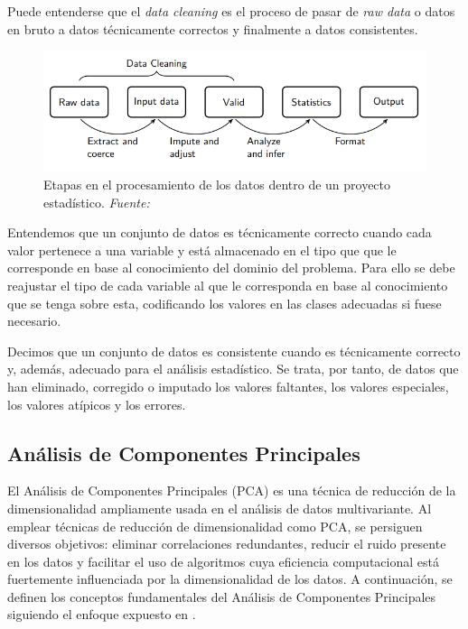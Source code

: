 \documentclass[12pt,a4paper,]{book}
\numberwithin{dummy}{section}
\theoremstyle{ocrenumbox}
\theoremstyle{blacknumex}
\theoremstyle{blacknumbox}
\theoremstyle{ocrenum}
\theoremstyle{ocrenum}
\begin{document}
Puede entenderse que el \emph{data cleaning} es el proceso de pasar de
\emph{raw data} o datos en bruto a datos técnicamente correctos y
finalmente a datos consistentes.

\begin{figure}[H]

{\centering \includegraphics[width=0.95\linewidth]{graficos/statistical_value_chain} 

}

\caption{Etapas en el procesamiento de los datos dentro de un proyecto estadístico. \it Fuente: \citet{van2018statistical}}\label{fig:unnamed-chunk-2}
\end{figure}

Entendemos que un conjunto de datos es técnicamente correcto cuando cada
valor pertenece a una variable y está almacenado en el tipo que que le
corresponde en base al conocimiento del dominio del problema. Para ello
se debe reajustar el tipo de cada variable al que le corresponda en base
al conocimiento que se tenga sobre esta, codificando los valores en las
clases adecuadas si fuese necesario.

Decimos que un conjunto de datos es consistente cuando es técnicamente
correcto y, además, adecuado para el análisis estadístico. Se trata, por
tanto, de datos que han eliminado, corregido o imputado los valores
faltantes, los valores especiales, los valores atípicos y los
errores.\citep{de2013introduction}

\hypertarget{anuxe1lisis-de-componentes-principales}{%
\subsection{Análisis de Componentes
Principales}\label{anuxe1lisis-de-componentes-principales}}

El Análisis de Componentes Principales (PCA) es una técnica de reducción
de la dimensionalidad ampliamente usada en el análisis de datos
multivariante. Al emplear técnicas de reducción de dimensionalidad como
PCA, se persiguen diversos objetivos: eliminar correlaciones
redundantes, reducir el ruido presente en los datos y facilitar el uso
de algoritmos cuya eficiencia computacional está fuertemente
influenciada por la dimensionalidad de los datos. A continuación, se
definen los conceptos fundamentales del Análisis de Componentes
Principales siguiendo el enfoque expuesto en \citet{PCAShaoDeng}.
\end{document}
